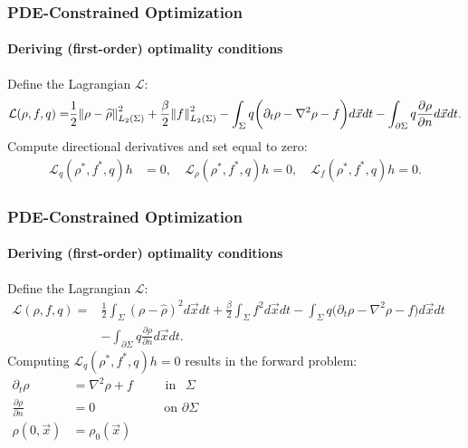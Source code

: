 \documentclass[aspectratio=169,xcolor=dvipsnames]{beamer}
\begin{document}
\begin{frame}
	\frametitle{PDE-Constrained Optimization}
		\framesubtitle{Deriving (first-order) optimality conditions}
	Define the Lagrangian $\mathcal{L}$:
	\begin{align*}
		\mathcal{L}(\rho, f,q)=& \frac{1}{2}\norm{\rho- \widehat{\rho}}_{L_2(\Sigma)}^2 + \frac{\beta}{2} \norm{f}_{L_2(\Sigma)}^2- \int_\Sigma q \bigg( \partial_t \rho - \nabla^2 \rho  - f \bigg) d\vec{x} dt - \int_{\partial \Sigma} q \frac{\partial \rho}{\partial n}   d\vec{x} dt.\\
	\end{align*}
	Compute directional derivatives and set equal to zero:
	\begin{align*}
		\mathcal{L}_q (\rho^*, f^*,q) h&= 0, \quad
		\mathcal{L}_\rho (\rho^*, f^*,q) h= 0, \quad
		\mathcal{L}_f (\rho^*, f^*,q) h= 0.
	\end{align*}
\end{frame}
\begin{frame}
	\frametitle{PDE-Constrained Optimization}
	\framesubtitle{Deriving (first-order) optimality conditions}
	Define the Lagrangian $\mathcal{L}$:
	\begin{align*}
		\mathcal{L}(\rho, f,q)=& \frac{1}{2}\int_\Sigma \left(\rho- \widehat{\rho}\right)^2 d \vec x dt + \frac{\beta}{2} \int_\Sigma f^2 d \vec x dt - \int_\Sigma q \bigg( \partial_t \rho - \nabla^2 \rho  - f \bigg) d\vec{x} dt \qquad \qquad\\
		&- \int_{\partial \Sigma} q \frac{\partial \rho}{\partial n}   d\vec{x} dt.
	\end{align*}
	Computing  $\mathcal{L}_q (\rho^*, f^*,q)h = 0$ results in the forward problem:
	\begin{align*}
		\partial_t \rho &= \nabla^2 \rho + f \ \qquad \text{  in    }\ \ \Sigma \phantom{vhfoijoihewrbgjkngmcojrpf      hfhioewjgpfinioer nnf}\\
		\frac{\partial \rho}{\partial n}  &= 0 \quad \ \ \qquad \qquad \text{on   } \partial \Sigma   \\
		\rho(0,\vec{x}) &= \rho_0(\vec{x})
	\end{align*}
\end{frame}
\end{document}
